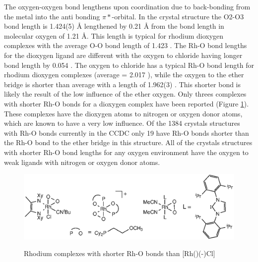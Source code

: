 The oxygen-oxygen bond lengthens upon coordination due to back-bonding from the metal into the anti bonding $\pi*$-orbital.  In the crystal structure the O2-O3 bond length is 1.424(5) \si{\angstrom} lengthened by 0.21 \si{\angstrom} from the bond length in molecular oxygen of 1.21 \si{\angstrom}.  This length is typical for rhodium dioxygen complexes with the average O-O bond length of 1.423 \A.  
The Rh-O bond lengths for the dioxygen ligand are different with the oxygen \trans{} to chloride having longer bond length by 0.054 \A.  The oxygen \trans{} to chloride has a typical Rh-O bond length for rhodium dioxygen complexes (average = 2.017 \A), while the oxygen \trans{} to the ether bridge is shorter than average with a length of 1.962(3) \A.  This shorter bond is likely the result of the low \trans{} influence of the ether oxygen.  Only threes complexes with shorter Rh-O bonds for a dioxygen complex have been reported (Figure \ref{ShorterRhOcomplexes}).\cite{Lindner1993b, Penner2011, Wechsler2012} These complexes have the dioxygen atoms \trans{} to nitrogen or oxygen donor atoms, which are known to have a very low \trans{} influence.  Of the 1384 crystals structures with Rh-O bonds currently in the CCDC only 19 have Rh-O bonds shorter than the Rh-O bond \trans{} to the ether bridge in this structure.  All of the crystals structures with shorter Rh-O bond lengths for any oxygen environment have the oxygen \trans{} to weak ligands with nitrogen or oxygen donor atoms.

\begin{figure}[htp]
\begin{center}
\vspace{0.5cm}
\includegraphics{../Figures/OtherRhO2complexes.eps}
\caption[Rhodium complexes with shorter Rh-O bonds than \texorpdfstring{[Rh(\tBuxantphos)(-)Cl{]}} R]{Rhodium complexes with shorter Rh-O bonds than \texorpdfstring{[Rh(\tBuxantphos)(-)Cl{]}} R}
\vspace{0.2cm}
\label{ShorterRhOcomplexes}
\end{center}
\end{figure}
\vspace{0.2cm}

